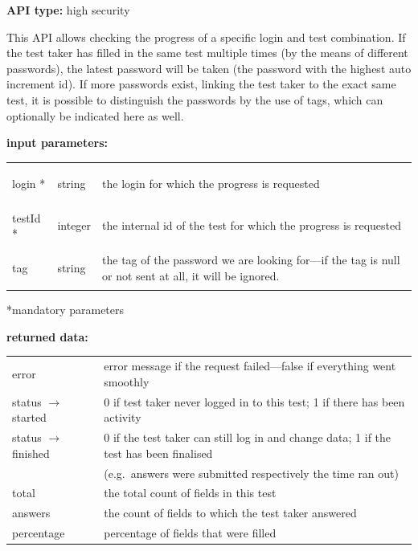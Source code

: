 \documentclass[12pt]{article} %
\newenvironment{keyword}{\leavevmode\color{magenta}}{}
\newenvironment{properties}
{
    \footnotesize\renewcommand{\arraystretch}{1.30}
    \renewcommand{\tabcolsep}{0pt}
    \begin{longtable}{>{\begin{keyword}}p{3.1cm}<{\end{keyword}}p{13.9cm}}
        \hline
        }
        {
        \hline
    \end{longtable}\vspace{5mm}
}
\newenvironment{parameters}
{
    \footnotesize\renewcommand{\arraystretch}{1.30}
    \renewcommand{\tabcolsep}{0pt}
    \begin{longtable}{>{\begin{keyword}}p{3cm}<{\end{keyword}}>{\begin{em}}p{1.5cm}<{\end{em}}p{12.5cm}}
        \hline
        }
        {
        \hline
    \end{longtable}\scriptsize\vspace{-5mm}*mandatory parameters\vspace{5mm}
}
\begin{document}
    \textbf{API type:} high security

    This API allows checking the progress of a specific login and test combination.
    If the test taker has filled in the same test multiple times (by the means of different passwords), the latest password will be taken (the password with the highest auto increment id).
    If more passwords exist, linking the test taker to the exact same test, it is possible to distinguish the passwords by the use of tags, which can optionally be indicated here as well.

    \begin{minipage}{\textwidth}
        \textbf{input parameters:}
        \begin{parameters}
            login *  & string  & the login for which the progress is requested                                                         \\
            testId * & integer & the internal id of the test for which the progress is requested                                       \\
            tag      & string  & the tag of the password we are looking for—if the tag is null or not sent at all, it will be ignored. \\
        \end{parameters}
    \end{minipage}

    \begin{minipage}{\textwidth}
        \textbf{returned data:}
        \begin{properties}
            error      & error message if the request failed—false if everything went smoothly \\
            status $\rightarrow$ started & 0 if test taker never logged in to this test;
            1 if there has been activity \\
            status $\rightarrow$ finished & 0 if the test taker can still log in and change data;
            1 if the test has been finalised \\      & (e.g.\ answers were submitted respectively the time ran out)                                \\
            total    & the total count of fields in this test                  \\
            answers & the count of fields to which the test taker answered                                 \\
            percentage & percentage of fields that were filled                                 \\
        \end{properties}
    \end{minipage}
\end{document}
